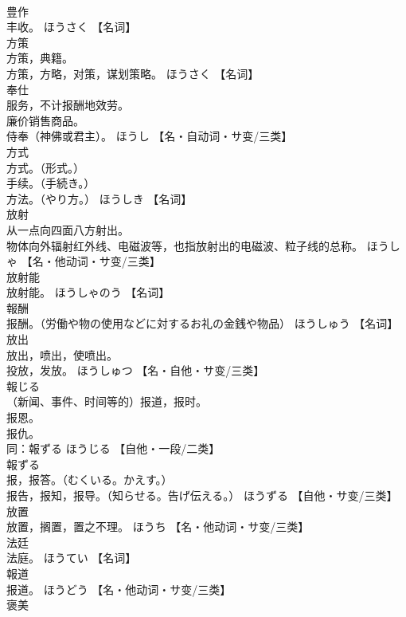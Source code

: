 \documentclass[8pt]{extreport}
\begin{document}
\begin{CJK}{UTF8}{min}
\\	豊作	
\\	丰收。	ほうさく		【名词】
\\	方策	
\\	方策，典籍。 
\\	方策，方略，对策，谋划策略。	ほうさく		【名词】
\\	奉仕	
\\	服务，不计报酬地效劳。 
\\	廉价销售商品。 
\\	侍奉（神佛或君主）。	ほうし		【名・自动词・サ变/三类】
\\	方式	
\\	方式。（形式。） 
\\	手续。（手続き。） 
\\	方法。（やり方。）	ほうしき		【名词】
\\	放射	
\\	从一点向四面八方射出。 
\\	物体向外辐射红外线、电磁波等，也指放射出的电磁波、粒子线的总称。	ほうしゃ		【名・他动词・サ变/三类】
\\	放射能	
\\	放射能。	ほうしゃのう		【名词】
\\	報酬	
\\	报酬。（労働や物の使用などに対するお礼の金銭や物品）	ほうしゅう		【名词】
\\	放出	
\\	放出，喷出，使喷出。 
\\	投放，发放。	ほうしゅつ		【名・自他・サ变/三类】
\\	報じる	
\\	（新闻、事件、时间等的）报道，报时。 
\\	报恩。 
\\	报仇。 
\\	同：報ずる	ほうじる		【自他・一段/二类】
\\	報ずる	
\\	报，报答。（むくいる。かえす。） 
\\	报告，报知，报导。（知らせる。告げ伝える。）	ほうずる		【自他・サ变/三类】
\\	放置	
\\	放置，搁置，置之不理。	ほうち		【名・他动词・サ变/三类】
\\	法廷	
\\	法庭。	ほうてい		【名词】
\\	報道	
\\	报道。	ほうどう		【名・他动词・サ变/三类】
\\	褒美	

\end{CJK}
\end{document}
